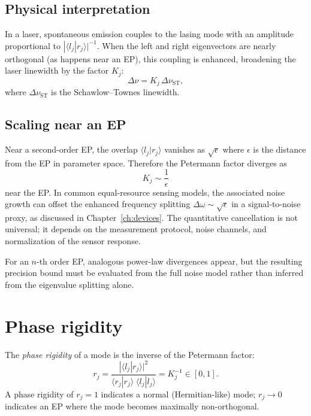 \subsection{Physical interpretation}
\label{ssec:petermann-physics-app}

In a laser, spontaneous emission couples to the lasing mode with an
amplitude proportional to $|\langle l_j | r_j \rangle|^{-1}$. When
the left and right eigenvectors are nearly orthogonal (as happens near
an EP), this coupling is enhanced, broadening the laser linewidth by
the factor $K_j$:
\begin{equation}
 \Delta\nu = K_j\,\Delta\nu_{\mathrm{ST}},
 \label{eq:petermann-linewidth-app}
\end{equation}
where $\Delta\nu_{\mathrm{ST}}$ is the Schawlow--Townes linewidth.

\subsection{Scaling near an EP}
\label{ssec:petermann-ep}

Near a second-order EP, the overlap $\langle l_j | r_j \rangle$
vanishes as $\sqrt{\epsilon}$ where $\epsilon$ is the distance from
the EP in parameter space. Therefore the Petermann factor diverges as
\begin{equation}
 K_j \sim \frac{1}{\epsilon}
 \label{eq:petermann-ep-scaling}
\end{equation}
near the EP. In common equal-resource sensing models, the associated
noise growth can offset the enhanced frequency splitting
$\Delta\omega \sim \sqrt{\epsilon}$ in a signal-to-noise proxy, as
discussed in Chapter~\ref{ch:devices}. The quantitative cancellation is
not universal; it depends on the measurement protocol, noise channels,
and normalization of the sensor response.

For an $n$-th order EP, analogous power-law divergences appear, but the
resulting precision bound must be evaluated from the full noise model
rather than inferred from the eigenvalue splitting alone.


\section{Phase rigidity}
\label{sec:phase-rigidity}

The \emph{phase rigidity} of a mode is the inverse of the Petermann
factor:
\begin{equation}
 r_j = \frac{|\langle l_j | r_j \rangle|^2}
 {\langle r_j | r_j \rangle \;\langle l_j | l_j \rangle}
 = K_j^{-1} \in [0, 1].
 \label{eq:phase-rigidity-def}
\end{equation}
A phase rigidity of $r_j = 1$ indicates a normal (Hermitian-like) mode;
$r_j \to 0$ indicates an EP where the mode becomes maximally
non-orthogonal.


